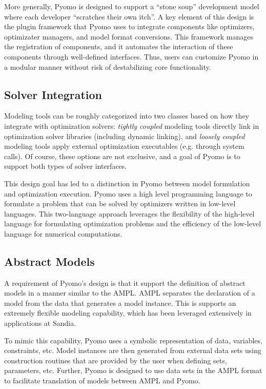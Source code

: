 More generally, Pyomo is designed to support a ``stone soup'' development
model where each developer ``scratches their own itch''.  A key element
of this design is the plugin framework that Pyomo uses to integrate
components like optimizers, optimizater managers, and model format
conversions.  This framework manages the registration of components,
and it automates the interaction of these components through well-defined
interfaces.  Thus, users can customize Pyomo in a modular manner without
risk of destabilizing core functionality.


\subsection{Solver Integration}

Modeling tools can be roughly categorized into two classes based on
how they integrate with optimization solvers: {\em tightly coupled}
modeling tools directly link in optimization solver libraries (including
dynamic linking), and {\em loosely coupled} modeling tools apply external
optimization executables (e.g. through system calls).  Of course, these
options are not exclusive, and a goal of Pyomo is to support both types
of solver interfaces.

This design goal has led to a distinction in Pyomo between model
formulation and optimization execution.  Pyomo uses a high level
programming language to formulate a problem that can be solved by
optimizers written in low-level languages.  This two-language approach
leverages the flexibility of the high-level language for formulating
optimization problems and the efficiency of the low-level language for
numerical computations.


\subsection{Abstract Models}

A requirement of Pyomo's design is that it support the definition of
abstract models in a manner similar to the AMPL.  AMPL separates the
declaration of a model from the data that generates a model instance.
This is supports an extremely flexible modeling capability, which has
been leveraged extensively in applications at Sandia.

To mimic this capability, Pyomo uses a symbolic representation of data,
variables, constraints, etc.  Model instances are then generated from
external data sets using construction routines that are provided by the
user when defining sets, parameters, etc.  Further, Pyomo is designed
to use data sets in the AMPL format to facilitate translation of models
between AMPL and Pyomo.


